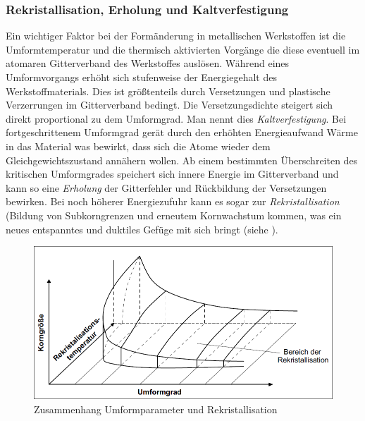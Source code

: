 \documentclass[12pt,a4paper,parskip,twoside,BCOR5mm,headsepline]{scrartcl}
\begin{document}
\begin{description*}
{\subsubsection{Rekristallisation, Erholung und Kaltverfestigung}
Ein wichtiger Faktor bei der Formänderung in metallischen Werkstoffen ist die Umformtemperatur und die thermisch aktivierten Vorgänge die diese eventuell im atomaren Gitterverband des Werkstoffes auslösen. Während eines Umformvorgangs erhöht sich stufenweise der Energiegehalt des Werkstoffmaterials. Dies ist größtenteils durch Versetzungen und plastische Verzerrungen im Gitterverband bedingt. Die Versetzungsdichte steigert sich direkt proportional zu dem Umformgrad. Man nennt dies \emph{Kaltverfestigung}. Bei fortgeschrittenem Umformgrad gerät durch den erhöhten Energieaufwand Wärme in das Material was bewirkt, dass sich die Atome wieder dem Gleichgewichtszustand annähern wollen. Ab einem bestimmten Überschreiten des kritischen Umformgrades speichert sich innere Energie im Gitterverband und kann so eine \emph{Erholung} der Gitterfehler und Rückbildung der Versetzungen bewirken. Bei noch höherer Energiezufuhr kann es sogar zur \emph{Rekristallisation} (Bildung von Subkorngrenzen und erneutem Kornwachstum kommen, was ein neues entspanntes und duktiles Gefüge mit sich bringt (siehe ).\autocite[11-13]{fu}
\begin{figure}
\centering
\includegraphics[width=.8\textwidth]{rekristall}
\caption[Zusammenhang Umformparameter und Rekristallisation]{Zusammenhang Umformparameter und Rekristallisation\autocite[13]{fu}}
\label{fig:rekristall}
\end{figure}






}
\end{description*}
\end{document}
